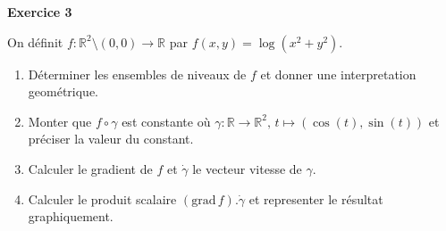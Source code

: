 \documentclass[a4paper,12pt]{article}
\begin{document}
\hrulefill

\vspace{1cm}

\begin{center}
{\large{\bf Exercice 3}}
\end{center}


On définit $f:\mathbb{R}^2 \setminus (0,0)\rightarrow	\mathbb{R}$ par $f(x,y) = \log(x^2 +
y^2)$.

\begin{enumerate}
	\item Déterminer les ensembles de niveaux de $f$ et
		donner une interpretation geométrique.
	\item Monter que $f\circ \gamma$ est constante o\`u
		$\gamma: \mathbb{R} \rightarrow
		\mathbb{R}^2
		,\, t \mapsto (\cos(t),\sin(t))$ et préciser
		la valeur du constant.

	\item  Calculer le gradient de $f$ et $\dot{\gamma}$ le vecteur
		vitesse de $\gamma$. 
	\item Calculer le produit scalaire 
		$(\mathrm{grad}\,f).\dot{\gamma}$ et representer le résultat
		graphiquement.
	
\end{enumerate}
 
\end{document}
